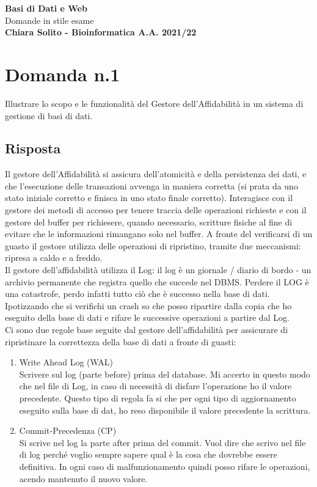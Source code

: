 \documentclass{article}
\begin{document}
    \begin{center}
        \vspace{0.5cm}
        \LARGE
        \textbf{Basi di Dati e Web\\}
        Domande in stile esame\\
        \vspace{0.5cm}
        \small
        \textbf{Chiara Solito - Bioinformatica A.A. 2021/22}
    \end{center}


\section*{Domanda n.1}
Illustrare lo scopo e le funzionalità del Gestore dell'Affidabilità in un sistema di gestione di basi di dati.
\subsection*{Risposta}
Il gestore dell'Affidabilità si assicura dell'atomicità e della persistenza dei dati, e che l'esecuzione delle transazioni avvenga in maniera corretta (si prata da uno stato iniziale corretto e finisca in uno stato finale corretto). Interagisce con il gestore dei metodi di accesso per tenere traccia delle operazioni richieste e con il gestore
del buffer per richiesere, quando necessario, scritture fisiche al fine di evitare che le informazioni rimangano solo nel buffer. A fronte del verificarsi di un guasto il gestore utilizza delle operazioni di ripristino, tramite due meccanismi: ripresa a caldo e a freddo.\\
Il gestore dell'affidabilità utilizza il Log: il log è un giornale / diario di bordo - un archivio permanente che registra quello che succede nel DBMS. Perdere il LOG è una catastrofe, perdo infatti tutto ciò che è successo nella base di dati. Ipotizzando che si verifichi un crash so che posso ripartire dalla copia che ho eseguito della base di dati e rifare le successive operazioni a partire dal Log.\\
Ci sono due regole base seguite dal gestore dell'affidabilità per assicurare di ripristinare la correttezza della base di dati a fronte di guasti:
\begin{enumerate}
    \item Write Ahead Log (WAL)\\ Scrivere sul log (parte before) prima del database. Mi accerto in questo modo che nel file di Log, in caso di necessità di disfare l'operazione ho il valore precedente. Questo tipo di regola fa si che per ogni tipo di aggiornamento eseguito sulla base di dat, ho reso disponibile il valore precedente la scrittura.
    \item Commit-Precedenza (CP)\\ Si scrive nel log la parte after prima del commit. Vuol dire che scrivo nel file di log perché voglio sempre sapere qual è la cosa che dovrebbe essere definitiva. In ogni caso di malfunzionamento quindi posso rifare le operazioni, acendo mantenuto il nuovo valore.
\end{enumerate}
\end{document}

